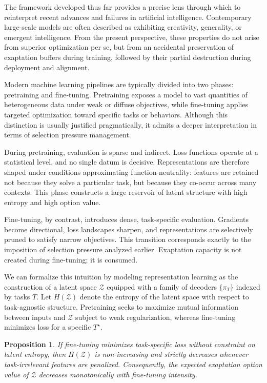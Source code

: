 \documentclass[11pt]{article}
\newtheorem{proposition}{Proposition}
\theoremstyle{definition}
\begin{document}
The framework developed thus far provides a precise lens through which to reinterpret recent advances and failures in artificial intelligence. Contemporary large-scale models are often described as exhibiting creativity, generality, or emergent intelligence. From the present perspective, these properties do not arise from superior optimization per se, but from an accidental preservation of exaptation buffers during training, followed by their partial destruction during deployment and alignment.

Modern machine learning pipelines are typically divided into two phases: pretraining and fine-tuning. Pretraining exposes a model to vast quantities of heterogeneous data under weak or diffuse objectives, while fine-tuning applies targeted optimization toward specific tasks or behaviors. Although this distinction is usually justified pragmatically, it admits a deeper interpretation in terms of selection pressure management.

During pretraining, evaluation is sparse and indirect. Loss functions operate at a statistical level, and no single datum is decisive. Representations are therefore shaped under conditions approximating function-neutrality: features are retained not because they solve a particular task, but because they co-occur across many contexts. This phase constructs a large reservoir of latent structure with high entropy and high option value.

Fine-tuning, by contrast, introduces dense, task-specific evaluation. Gradients become directional, loss landscapes sharpen, and representations are selectively pruned to satisfy narrow objectives. This transition corresponds exactly to the imposition of selection pressure analyzed earlier. Exaptation capacity is not created during fine-tuning; it is consumed.

We can formalize this intuition by modeling representation learning as the construction of a latent space $\mathcal{Z}$ equipped with a family of decoders $\{\pi_T\}$ indexed by tasks $T$. Let $H(\mathcal{Z})$ denote the entropy of the latent space with respect to task-agnostic structure. Pretraining seeks to maximize mutual information between inputs and $\mathcal{Z}$ subject to weak regularization, whereas fine-tuning minimizes loss for a specific $T^\star$.

\begin{proposition}
If fine-tuning minimizes task-specific loss without constraint on latent entropy, then $H(\mathcal{Z})$ is non-increasing and strictly decreases whenever task-irrelevant features are penalized. Consequently, the expected exaptation option value of $\mathcal{Z}$ decreases monotonically with fine-tuning intensity.
\end{proposition}
\end{document}
